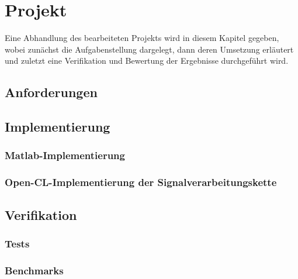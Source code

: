 \documentclass[a4paper,12pt,oneside,german,toc=bibliography]{scrbook}
\theoremstyle{definition}
\theoremstyle{plain}
\numberwithin{equation}{section}
\begin{document}

\chapter{Projekt}
\label{chap:Projekt}

Eine Abhandlung des bearbeiteten Projekts wird in diesem Kapitel gegeben,
wobei zunächst die Aufgabenstellung dargelegt, dann deren Umsetzung erläutert und zuletzt eine Verifikation und Bewertung der Ergebnisse durchgeführt wird.

\section{Anforderungen}


\section{Implementierung}

\subsection{Matlab-Implementierung}
\subsection{Open-CL-Implementierung der Signalverarbeitungskette}


\section{Verifikation}

\subsection{Tests}     
\subsection{Benchmarks}

\end{document}

